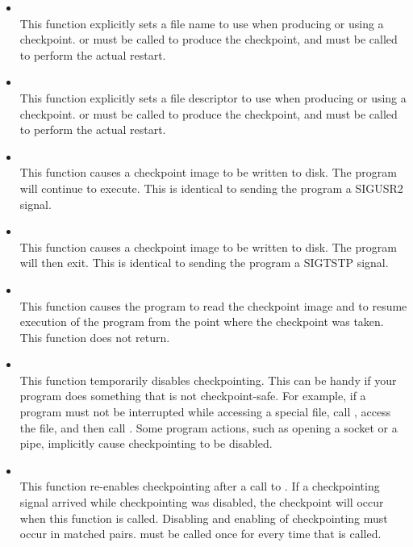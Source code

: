 \begin{itemize}

\item {}\\
This function explicitly sets a file name to use when
producing or using a checkpoint.
 or
 must be called to produce the
checkpoint, and
 must be called to perform the
actual restart.

\item {}\\
This function explicitly sets a file descriptor to use when
producing or using a checkpoint.
 or
 must be called to produce the
checkpoint, and
 must be called to perform the
actual restart.

\item {}\\
This function causes a checkpoint image to be written to disk.
The program will continue to execute.  This is identical to sending
the program a SIGUSR2 signal.

\item {}\\
This function causes a checkpoint image to be written to disk.
The program will then exit.  This is identical to sending the program
a SIGTSTP signal.

\item {}\\
This function causes the program to read the checkpoint
image and to resume
execution of the program from the point where the checkpoint
was taken.
This function does not return.

\item {}\\
This function temporarily disables checkpointing.  This can
be handy if your program does something that is not checkpoint-safe.
For example, if a program must not be interrupted while accessing
a special file, call , access the
file, and then call .  Some program
actions, such as opening a socket or a pipe, implicitly cause
checkpointing to be disabled.

\item {}\\
This function re-enables checkpointing after a call to
.  If a checkpointing signal arrived
while checkpointing was disabled, the checkpoint will occur when
this function is called.  Disabling and enabling of checkpointing
must occur in matched pairs.   must
be called once for every time that 
is called.


\end{itemize}
